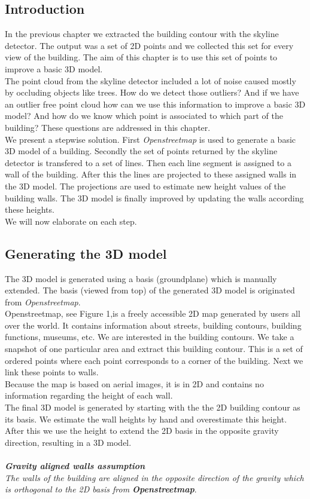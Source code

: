 \subsection{Introduction}
In the previous chapter we extracted the building contour with the skyline
detector. The output was a set of 2D points and we collected this set for every
view of the building.  The aim of this chapter is to use this set of points to
improve a basic 3D model. \\
The point cloud from the skyline detector included a lot of noise caused mostly
by occluding objects like trees. How do we detect those outliers?
And if we have an outlier free point cloud how can we use this information to
improve a basic 3D model? And how do we know which point is associated to which part of the
building?  These questions are addressed in this chapter.\\
We present a stepwise solution. First \emph{Openstreetmap} is used to generate
a basic 3D model of a building. Secondly the set of points returned by the
skyline detector is transfered to a set of lines. Then each line segment is
assigned to a wall of the building. After this the lines are projected to these
assigned walls in the 3D model.  The projections are used to estimate new
height values of the building walls.  The 3D model is finally improved by updating the
walls according these heights. \\
We will now elaborate on each step.\\

\subsection{Generating the 3D model}
The 3D model is generated using a basis (groundplane) which is manually extended.
The basis (viewed from top) of the generated 3D model is originated from
\emph{Openstreetmap}.\\
Openstreetmap, see Figure 1,is a freely accessible 2D map generated by
users all over the world. It contains information about streets, building
contours, building functions, museums, etc.  We are interested in the building
contours.  We take a snapshot of one particular area and extract this building
contour.  This is a set of ordered points where each point corresponds to a
corner of the building.  Next we link these points to walls.\\ 
Because the map is based on aerial images, it is in 2D and contains no
information regarding the height of each wall.  \\
The final 3D model is generated by starting with the the 2D building contour as
its basis. We estimate the wall heights by hand and overestimate this height.
After this we use the height to extend the 2D basis in the opposite gravity direction,
resulting in a 3D model.\\\\
\textbf{\emph{Gravity aligned walls assumption}}\\
	\emph{The walls of the building are aligned in the opposite direction of the gravity
	which is orthogonal to the 2D basis from \textbf{Openstreetmap}}.\\

